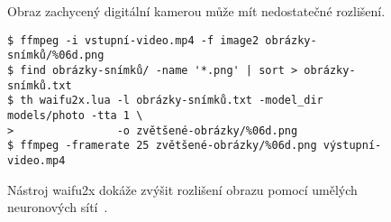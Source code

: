 \vspace{-15pt}%
\begingroup
{}%
\begin{subfigure}{\linewidth}

\caption{Obraz zachycený digitální kamerou může mít nedostatečné rozlišení.}
\end{subfigure}
\begin{subfigure}{\linewidth}
\par\vspace{7.5pt}%
\begingroup
\small
\begin{verbatim}
$ ffmpeg -i vstupní-video.mp4 -f image2 obrázky-snímků/%06d.png
$ find obrázky-snímků/ -name '*.png' | sort > obrázky-snímků.txt
$ th waifu2x.lua -l obrázky-snímků.txt -model_dir models/photo -tta 1 \
>                -o zvětšené-obrázky/%06d.png
$ ffmpeg -framerate 25 zvětšené-obrázky/%06d.png výstupní-video.mp4
\end{verbatim}
\endgroup

\caption{Nástroj waifu2x dokáže zvýšit rozlišení obrazu pomocí umělých neuronových sítí~\cite{dong2016image}.}
\end{subfigure}
\endgroup